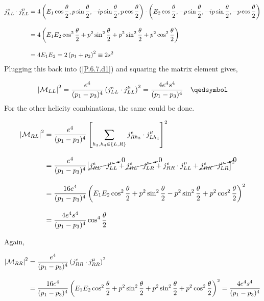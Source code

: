 \begin{solution}
\begin{enumerate}[label=(\alph*)]
            \begin{align*}
                j^e_{LL}\cdot j^\mu_{LL} &= 4 \left(E_1 \cos\frac{\theta}{2} , p \sin\frac{\theta}{2},-ip\sin\frac{\theta}{2} , p\cos\frac{\theta}{2} \right) \cdot \left( E_2 \cos\frac{\theta}{2} , -p \sin\frac{\theta}{2} , -ip\sin\frac{\theta}{2} , -p\cos\frac{\theta}{2} \right) \\[0.12in]
                &= 4\left(E_1E_2 \cos^2\frac{\theta}{2} +p^2\sin^2\frac{\theta}{2} + p^2 \sin^2\frac{\theta}{2} + p^2 \cos^2 \frac{\theta}{2} \right) \\[0.12in]
                &= 4E_1E_2 = 2 \left(p_1+p_2\right)^2 \equiv 2s^2  \\ 
            \end{align*}
        Plugging this back into (\ref{P.6.7.d1}) and squaring the matrix element gives,

            \begin{align*}
                \left| \mathcal{M}_{LL} \right|^2 = \frac{e^4}{(p_1-p_3)^4} \left(j^e_{LL}\cdot j^\mu_{LL}\right)^2 =  \frac{4e^4s^4}{(p_1-p_3)^4} \qed \\
            \end{align*}
        For the other helicity combinations, the same could be done. 

            \begin{align*}
                \left|\mathcal{M}_{RL}\right|^2 &= \frac{e^4}{(p_1-p_3)^4}\left[ \sum_{h_3,h_4 \in \{L,R\}} j^e_{Rh_3} \cdot j^\mu_{Lh_4}\right]^2  \\[0.125in] 
                &=  \frac{e^4}{(p_1-p_3)^4} \big[\cancelto{0}{j^e_{RL}\cdot j^\mu_{LL}}+ \cancelto{0}{j^e_{RL}\cdot j^\mu_{LR} }+ j^e_{RR}\cdot j^\mu_{LL} + \cancelto{0}{j^e_{RR}\cdot j^\mu_{LR}} \big]^2 \\[0.125in]
                &= \frac{16e^4}{(p_1-p_3)^4} \left( E_1E_2\cos^2\frac{\theta}{2} + p^2 \sin^2\frac{\theta}{2} - p^2 \sin^2\frac{\theta}{2} + p^2 \cos^2\frac{\theta}{2} \right)^2 \\[0.125in]
                &= \frac{4e^4s^4}{(p_1-p_3)^4}  \cos^4\frac{\theta}{2} 
            \end{align*}

        Again, 

            \begin{align*}
                \left|\mathcal{M}_{RR}\right|^2 &= \frac{e^4}{(p_1-p_3)^4} \left(j^e_{RR}\cdot j^\mu_{RR}\right)^2  \\[0.125in] 
                &= \frac{16e^4}{(p_1-p_3)^4} \left( E_1E_2\cos^2\frac{\theta}{2} + p^2 \sin^2\frac{\theta}{2} + p^2 \sin^2\frac{\theta}{2} + p^2 \cos^2\frac{\theta}{2} \right)^2 =  \frac{4e^4s^4}{(p_1-p_3)^4} 
            \end{align*}


\end{enumerate}
\end{solution}
